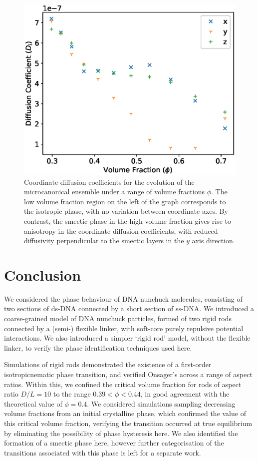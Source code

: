 \documentclass[11pt, a4paper]{article} %
\begin{document}
\begin{figure} [h!]
	\centering
	\includegraphics[width=0.7\linewidth]{Figures/nun_diff_Dcoeff}
	\caption{Coordinate diffusion coefficients for the evolution of the microcanonical ensemble under a range of volume fractions $\phi$. The low volume fraction region on the left of the graph corresponds to the isotropic phase, with no variation between coordinate axes. By contrast, the smectic phase in the high volume fraction gives rise to anisotropy in the coordinate diffusion coefficients, with reduced diffusivity perpendicular to the smectic layers in the $y$ axis direction.}
	\label{fig:nun_diff_Dcoeff}
\end{figure}  %


\section{Conclusion}

We considered the phase behaviour of DNA nunchuck molecules, consisting of two sections of ds-DNA connected by a short section of ss-DNA. We introduced a coarse-grained model of DNA nunchuck particles, formed of two rigid rods connected by a (semi-) flexible linker, with soft-core purely repulsive potential interactions. We also introduced a simpler `rigid rod' model, without the flexible linker, to verify the phase identification techniques used here.

Simulations of rigid rods demonstrated the existence of a first-order isotropic\textendash nematic phase transition, and verified Onsager's across a range of aspect ratios. Within this, we confined the critical volume fraction for rods of aspect ratio $D/L = 10$ to the range $0.39<\phi<0.44$, in good agreement with the theoretical value of $\phi = 0.4$. We considered simulations sampling decreasing volume fractions from an initial crystalline phase, which confirmed the value of this critical volume fraction, verifying the transition occurred at true equilibrium by eliminating the possibility of phase hysteresis here. We also identified the formation of a smectic phase here, however further categorisation of the transitions associated with this phase is left for a separate work.
\end{document}
